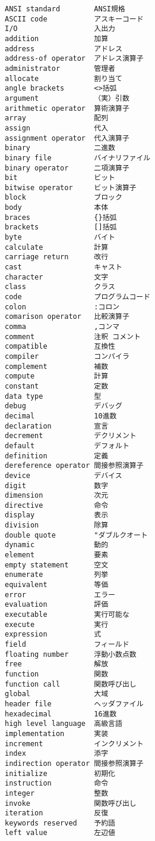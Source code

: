 \documentclass[12pt,a4j]{jarticle}
\begin{document}
{\setlength{\columnsep}{.5zw}
\begin{multicols}{3}
{\scriptsize
\begin{verbatim}
ANSI standard        ANSI規格
ASCII code           アスキーコード
I/O                  入出力
addition             加算
address              アドレス
address-of operator  アドレス演算子
administrator        管理者
allocate             割り当て
angle brackets       <>括弧
argument             （実）引数
arithmetic operator  算術演算子 
array                配列
assign               代入
assignment operator  代入演算子 
binary               二進数
binary file          バイナリファイル
binary operator      二項演算子
bit                  ビット
bitwise operator     ビット演算子
block                ブロック
body                 本体
braces               {}括弧
brackets             []括弧
byte                 バイト
calculate            計算
carriage return      改行
cast                 キャスト
character            文字
class                クラス
code                 プログラムコード
colon                :コロン
comarison operator   比較演算子
comma                ,コンマ
comment              注釈 コメント
compatible           互換性
compiler             コンパイラ
complement           補数
compute              計算
constant             定数
data type            型
debug                デバッグ
decimal              10進数
declaration          宣言
decrement            デクリメント
default              デフォルト
definition           定義
dereference operator 間接参照演算子
device               デバイス
digit                数字
dimension            次元
directive            命令
display              表示
division             除算
double quote         "ダブルクオート
dynamic              動的
element              要素
empty statement      空文
enumerate            列挙
equivalent           等価
error                エラー
evaluation           評価
executable           実行可能な
execute              実行
expression           式
field                フィールド
floating number      浮動小数点数
free                 解放
function             関数
function call        関数呼び出し
global               大域
header file          ヘッダファイル
hexadecimal          16進数
high level language  高級言語
implementation       実装
increment            インクリメント
index                添字
indirection operator 間接参照演算子
initialize           初期化
instruction          命令
integer              整数
invoke               関数呼び出し
iteration            反復
keywords reserved    予約語
left value           左辺値

\end{verbatim}}
\end{multicols}}
\end{document}
